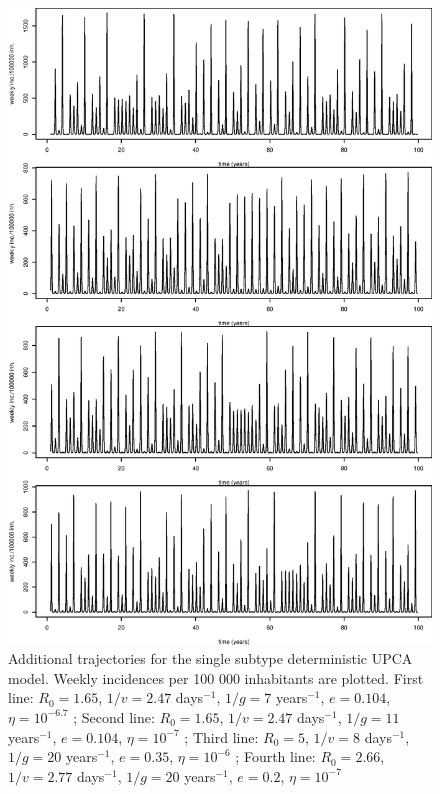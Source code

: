 \begin{figure}[htbp]
  \center
  \includegraphics[width= 0.8 \linewidth]{texte/article2/graph_annexe/1strain_traj100.eps}
  \caption{Additional trajectories for the single subtype deterministic UPCA model. Weekly
    incidences per 100 000 inhabitants are plotted.
    First line: $R_0=1.65$, $1/v=2.47$ days$^{-1}$, $1/g=7$
    years$^{-1}$, $e=0.104$, $\eta=10^{-6.7}$ ;
    Second line: $R_0=1.65$, $1/v=2.47$ days$^{-1}$, $1/g=11$
    years$^{-1}$, $e=0.104$, $\eta=10^{-7}$ ;
    Third line: $R_0=5$, $1/v=8$ days$^{-1}$, $1/g=20$ years$^{-1}$,
    $e=0.35$, $\eta=10^{-6}$ ;
    Fourth line: $R_0=2.66$, $1/v=2.77$ days$^{-1}$, $1/g=20$ years$^{-1}$, $e=0.2$, $\eta=10^{-7}$
  }
\label{fig:1strain_traj100}
\end{figure}



